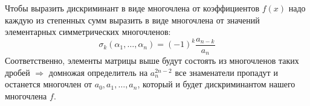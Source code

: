 \documentclass[12pt]{article}
\theoremstyle{definition}
\begin{document}
Чтобы выразить дискриминант в виде многочлена от коэффициентов $f(x)$ надо каждую из степенных сумм выразить в виде многочлена от значений элементарных симметрических многочленов: 
$$
	\sigma_k(\alpha_1,\dotsc,\alpha_n) = (-1)^k\dfrac{a_{n-k}}{a_n}
$$
Соответственно, элементы матрицы выше будут состоять из многочленов таких дробей $\Rightarrow$ домножая определитель на $a_n^{2n-2}$ все знаменатели пропадут и останется многочлен от $a_0,a_1,\dotsc, a_n$, который и будет дискриминантом нашего многочлена $f$.
\end{document}
